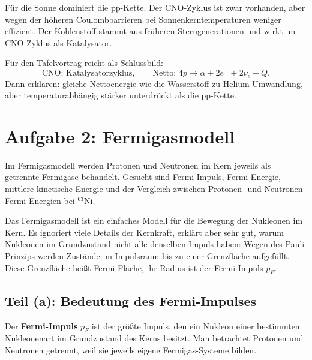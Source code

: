 \documentclass[11pt,a4paper]{scrartcl}
\newcommand{\isotope}[2]{^{#1}\mathrm{#2}}
\theoremstyle{definition}
\theoremstyle{plain}
\theoremstyle{remark}
\begin{document}
\begin{answerbox}
Für die Sonne dominiert die pp-Kette. Der CNO-Zyklus ist zwar vorhanden, aber wegen der höheren Coulombbarrieren bei Sonnenkerntemperaturen weniger effizient. Der Kohlenstoff stammt aus früheren Sterngenerationen und wirkt im CNO-Zyklus als Katalysator.
\end{answerbox}

\begin{talkbox}
Für den Tafelvortrag reicht als Schlussbild:
\[
    \text{CNO: Katalysatorzyklus},\qquad
    \text{Netto: }4p\to \alpha+2e^++2\nu_e+Q.
\]
Dann erklären: gleiche Nettoenergie wie die Wasserstoff-zu-Helium-Umwandlung, aber temperaturabhängig stärker unterdrückt als die pp-Kette.
\end{talkbox}

\FloatBarrier
\newpage

\section{Aufgabe 2: Fermigasmodell}

\begin{taskbox}
Im Fermigasmodell werden Protonen und Neutronen im Kern jeweils als getrennte Fermigase behandelt. Gesucht sind Fermi-Impuls, Fermi-Energie, mittlere kinetische Energie und der Vergleich zwischen Protonen- und Neutronen-Fermi-Energien bei \(\isotope{63}{Ni}\).
\end{taskbox}

\begin{learnbox}
Das Fermigasmodell ist ein einfaches Modell für die Bewegung der Nukleonen im Kern. Es ignoriert viele Details der Kernkraft, erklärt aber sehr gut, warum Nukleonen im Grundzustand nicht alle denselben Impuls haben: Wegen des Pauli-Prinzips werden Zustände im Impulsraum bis zu einer Grenzfläche aufgefüllt. Diese Grenzfläche heißt Fermi-Fläche, ihr Radius ist der Fermi-Impuls \(p_F\).
\end{learnbox}

\subsection{Teil (a): Bedeutung des Fermi-Impulses}

\begin{definitionbox}
Der \textbf{Fermi-Impuls} \(p_F\) ist der größte Impuls, den ein Nukleon einer bestimmten Nukleonenart im Grundzustand des Kerns besitzt. Man betrachtet Protonen und Neutronen getrennt, weil sie jeweils eigene Fermigas-Systeme bilden.
\end{definitionbox}
\end{document}
